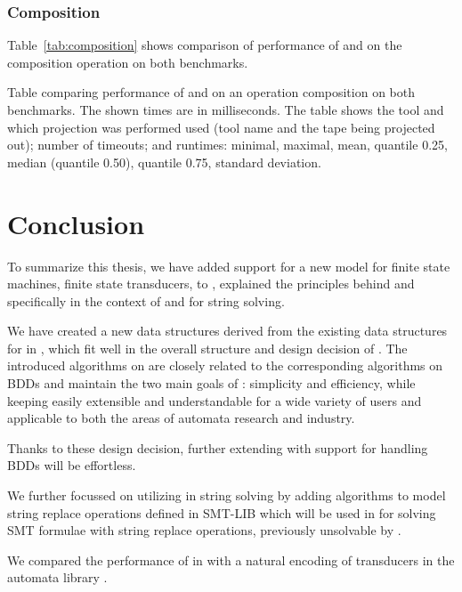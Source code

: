 \subsection{Composition}

Table~\ref{tab:composition} shows comparison of performance of \mata and \mona on the composition operation on both benchmarks.

\begin{table}[ht]
  \centering
  
  \caption{
    Table comparing performance of \mata and \mona on an operation composition on both benchmarks.
    The shown times are in milliseconds.
    The table shows the tool and which projection was performed used (tool name and the tape being projected out); number of timeouts; and runtimes: minimal, maximal, mean, quantile 0.25, median (quantile 0.50), quantile 0.75, standard deviation.
  }
  \label{tab:composition}
\end{table}


\chapter{Conclusion}

To summarize this thesis, we have added support for a new model for finite state machines, finite state transducers, to \mata, explained the principles behind \nfts and specifically \nfts in the context of \mata and \noodler for string solving.

We have created a new data structures derived from the existing data structures for \nfas in \mata, which fit well in the overall structure and design decision of \mata.
The introduced algorithms on \nfts are closely related to the corresponding algorithms on BDDs and maintain the two main goals of \mata: simplicity and efficiency, while keeping \mata easily extensible and understandable for a wide variety of users and applicable to both the areas of automata research and industry.

Thanks to these design decision, further extending \mata with support for handling BDDs will be effortless.

We further focussed on utilizing \nfts in string solving by adding algorithms to model string replace operations defined in SMT-LIB which will be used in \noodler for solving SMT formulae with string replace operations, previously unsolvable by \noodler.

We compared the performance of \nfts in \mata with a natural encoding of transducers in the automata library \mona.

